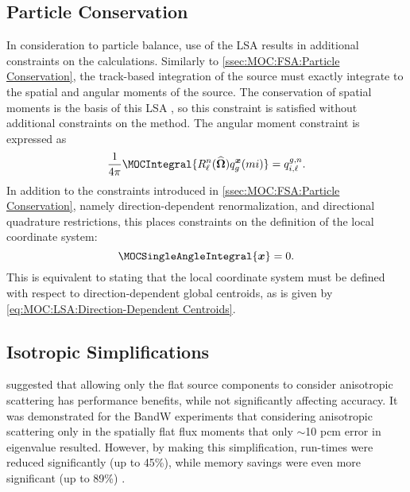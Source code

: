 {{        \subsection{Particle Conservation}{\label{ssec:MOC:LSA:Particle Conservation}
            In consideration to particle balance, use of the \ac{LSA} results in additional constraints on the calculations.
            Similarly to \cref{ssec:MOC:FSA:Particle Conservation}, the track-based integration of the source must exactly integrate to the spatial and angular moments of the source.
            The conservation of spatial moments is the basis of this \ac{LSA} \cite{Ferrer2018}, so this constraint is satisfied without additional constraints on the method.
            The angular moment constraint is expressed as
            \begin{equation}\label{eq:MOC:LSA:Angular Moment Constaint}
                \rfourpi\MOCIntegral{\SH\source[mi][g][\loc]} = \srcF[i,\ell][g,n].
            \end{equation}
            In addition to the constraints introduced in \cref{ssec:MOC:FSA:Particle Conservation}, namely direction-dependent renormalization, and directional quadrature restrictions, this places constraints on the definition of the local coordinate system:
            \begin{equation}\label{eq:MOC:LSA:Anisotropic Coordinate Constraint}
                \MOCSingleAngleIntegral{\loc} = 0.
            \end{equation}
            This is equivalent to stating that the local coordinate system must be defined with respect to direction-dependent global centroids, as is given by \cref{eq:MOC:LSA:Direction-Dependent Centroids}.
        }
        \subsection{Isotropic Simplifications}{\label{ssec:MOC:LSA:Isotropic Simplifications}
            \citet{Ferrer2016} suggested that allowing only the flat source components to consider anisotropic scattering has performance benefits, while not significantly affecting accuracy.
            It was demonstrated for the \acf{BandW} experiments \cite{Hoovler1980} that considering anisotropic scattering only in the spatially flat flux moments that only $\sim$10 pcm error in eigenvalue resulted.
            However, by making this simplification, run-times were reduced significantly (up to 45\%), while memory savings were even more significant (up to 89\%) \cite{Ferrer2016}.

}}}
